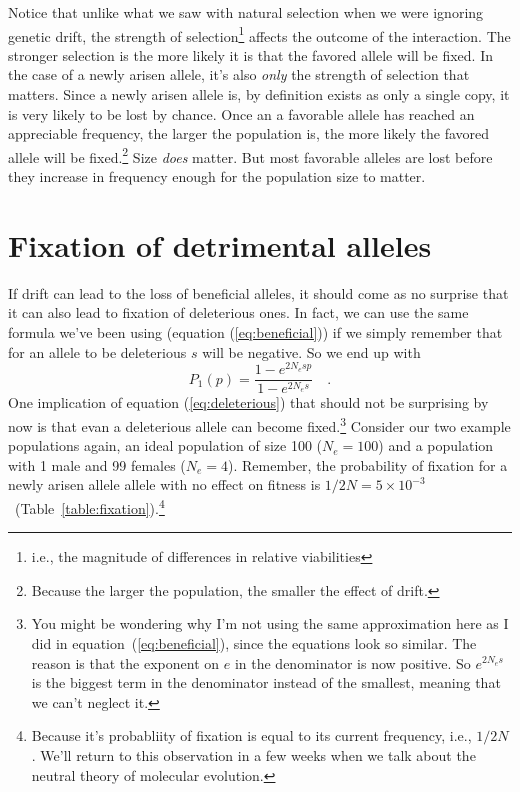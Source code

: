 Notice that unlike what we saw with natural selection when we were
ignoring genetic drift, the strength of selection\footnote{i.e., the
  magnitude of differences in relative viabilities} affects the
outcome of the interaction. The stronger selection is the more likely
it is that the favored allele will be fixed. In the case of a newly
arisen allele, it's also {\it only\/} the strength of selection that
matters. Since a newly arisen allele is, by definition exists as only
a single copy, it is very likely to be lost by chance. Once an a
favorable allele has reached an appreciable frequency, the larger the
population is, the more likely the favored allele will be
fixed.\footnote{Because the larger the population, the smaller the
  effect of drift.} Size {\it does\/} matter. But most favorable
alleles are lost before they increase in frequency enough for the
population size to matter.

\section*{Fixation of detrimental alleles}

If drift can lead to the loss of beneficial alleles, it should come as
no surprise that it can also lead to fixation of deleterious ones. In
fact, we can use the same formula we've been using (equation
(\ref{eq:beneficial})) if we simply remember that for an allele to be
deleterious $s$ will be negative. So we end up with
\begin{equation}
P_1(p) = \frac{1 - e^{2N_esp}}{1 - e^{2N_es}} \quad .
\label{eq:deleterious}
\end{equation}
One implication of equation (\ref{eq:deleterious}) that should not be
surprising by now is that evan a deleterious allele can become
fixed.\footnote{You might be wondering why I'm not using the same
  approximation here as I did in equation~(\ref{eq:beneficial}), since
  the equations look so similar. The reason is that the exponent on
  $e$ in the denominator is now positive. So $e^{2N_es}$ is the
  biggest term in the denominator instead of the smallest, meaning
  that we can't neglect it.} Consider our two example populations
again, an ideal population of size 100 ($N_e = 100$) and a population
with 1 male and 99 females ($N_e = 4$). Remember, the probability of
fixation for a newly arisen allele allele with no effect on fitness is
$1/2N = 5 \times
10^{-3}$~(Table~\ref{table:fixation}).\footnote{Because
  it's probabliity of fixation is equal to its current frequency,
  i.e., $1/2N$. We'll return to this observation in a few weeks when
  we talk about the neutral theory of molecular evolution.}


